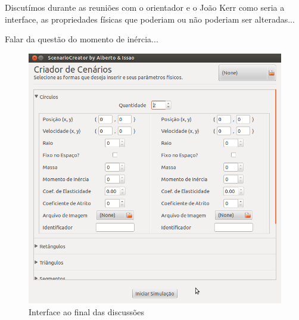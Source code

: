 Discutímos durante as reuniões com o orientador e o João Kerr como seria a interface, as propriedades físicas que poderiam ou não poderiam ser alteradas...

Falar da questão do momento de inércia...

\begin{figure}[H]
	\centering
	\caption{Interface ao final das discussões}
	\includegraphics[scale=0.3]{images/physimulation.png}
	\hspace{0.5cm}
\end{figure}

